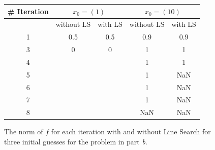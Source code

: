 \begin{figure}[H]
 \centering
\begin{tabular}{ |c || c|c || c|c |}
 \hline
 \# Iteration  &\multicolumn{2}{|c||}{$x_{0}=(1)$} & \multicolumn{2}{|c|}{$x_{0}=(10)$} \\ 
  \hline
 	& without LS & with LS & without LS & with LS\\
  \hhline{|=|=|=|=|=|}                           
1 &0.5		      & 0.5		     &0.9	   &0.9\\
\hline
3 & 0		      & 0    	     &1	       &1\\                                                                  
\hline
4 & 		      &     	     &1	       &1\\                                                                  
\hline
5 & 		      &     	     &1	       &NaN\\                                                                  
\hline
6 & 		      &     	     &1	       &NaN\\                                                                  
\hline
7 & 		      &     	     &1	       &NaN\\                                                                  
\hline
8 & 		      &     	     &NaN      &NaN\\
\hline
\end{tabular} 
  \caption{The norm of $f$ for each iteration with and without Line Search for three initial guesses for the problem in part \emph{b}.}
   \label{tab:part_b}
\end{figure} 





